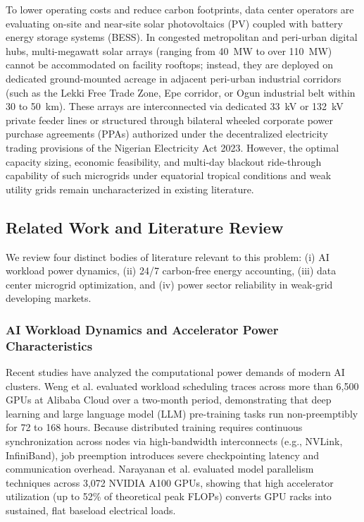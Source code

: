 \documentclass[11pt,a4paper]{article}
\begin{document}
To lower operating costs and reduce carbon footprints, data center operators are evaluating on-site and near-site solar photovoltaics (PV) coupled with battery energy storage systems (BESS). In congested metropolitan and peri-urban digital hubs, multi-megawatt solar arrays (ranging from 40~MW to over 110~MW) cannot be accommodated on facility rooftops; instead, they are deployed on dedicated ground-mounted acreage in adjacent peri-urban industrial corridors (such as the Lekki Free Trade Zone, Epe corridor, or Ogun industrial belt within 30 to 50~km). These arrays are interconnected via dedicated 33~kV or 132~kV private feeder lines or structured through bilateral wheeled corporate power purchase agreements (PPAs) authorized under the decentralized electricity trading provisions of the Nigerian Electricity Act 2023. However, the optimal capacity sizing, economic feasibility, and multi-day blackout ride-through capability of such microgrids under equatorial tropical conditions and weak utility grids remain uncharacterized in existing literature.

\subsection{Related Work and Literature Review}
\label{sec:lit_review}

We review four distinct bodies of literature relevant to this problem: (i) AI workload power dynamics, (ii) 24/7 carbon-free energy accounting, (iii) data center microgrid optimization, and (iv) power sector reliability in weak-grid developing markets.

\subsubsection{AI Workload Dynamics and Accelerator Power Characteristics}
Recent studies have analyzed the computational power demands of modern AI clusters. Weng et al. \cite{Weng2022} evaluated workload scheduling traces across more than 6,500 GPUs at Alibaba Cloud over a two-month period, demonstrating that deep learning and large language model (LLM) pre-training tasks run non-preemptibly for 72 to 168 hours. Because distributed training requires continuous synchronization across nodes via high-bandwidth interconnects (e.g., NVLink, InfiniBand), job preemption introduces severe checkpointing latency and communication overhead. Narayanan et al. \cite{Narayanan2021} evaluated model parallelism techniques across 3,072 NVIDIA A100 GPUs, showing that high accelerator utilization (up to 52\% of theoretical peak FLOPs) converts GPU racks into sustained, flat baseload electrical loads.
\end{document}
